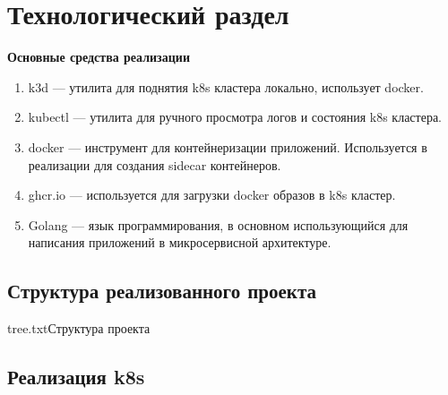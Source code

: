 \chapter{Технологический раздел}

\textbf{Основные средства реализации}
\begin{enumerate}
\item k3d --- утилита для поднятия k8s кластера локально, использует docker. %
\item kubectl --- утилита для ручного просмотра логов и состояния k8s кластера.
\item docker --- инструмент для контейнеризации приложений. Используется в реализации для создания sidecar контейнеров.
\item ghcr.io --- используется для загрузки docker образов в k8s кластер.
\item Golang --- язык программирования, в основном использующийся для написания приложений в микросервисной архитектуре. %
\end{enumerate}

\section{Структура реализованного проекта}
	{tree.txt}{Структура проекта}


\section{Реализация k8s}

%	
%
%
